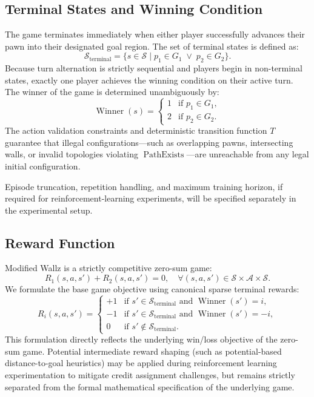 \documentclass{article}
\begin{document}
\subsection{Terminal States and Winning Condition}
\label{subsec:terminal_states}

The game terminates immediately when either player successfully advances their pawn into their designated goal region. The set of terminal states is defined as:
\begin{equation}
\mathcal{S}_{\text{terminal}} = \big\{ s \in \mathcal{S} \;\big|\; p_1 \in G_1 \;\lor\; p_2 \in G_2 \big\}.
\end{equation}
Because turn alternation is strictly sequential and players begin in non-terminal states, exactly one player achieves the winning condition on their active turn. The winner of the game is determined unambiguously by:
\begin{equation}
\operatorname{Winner}(s) = \begin{cases}
1 & \text{if } p_1 \in G_1, \\
2 & \text{if } p_2 \in G_2.
\end{cases}
\end{equation}
The action validation constraints and deterministic transition function $T$ guarantee that illegal configurations---such as overlapping pawns, intersecting walls, or invalid topologies violating $\operatorname{PathExists}$---are unreachable from any legal initial configuration.

Episode truncation, repetition handling, and maximum training horizon, if required for reinforcement-learning experiments, will be specified separately in the experimental setup.

\subsection{Reward Function}
\label{subsec:reward_function}

Modified Wallz is a strictly competitive zero-sum game:
\begin{equation}
R_1(s, a, s') + R_2(s, a, s') = 0, \quad \forall (s, a, s') \in \mathcal{S} \times \mathcal{A} \times \mathcal{S}.
\end{equation}
We formulate the base game objective using canonical sparse terminal rewards:
\begin{equation}
R_i(s, a, s') = \begin{cases}
+1 & \text{if } s' \in \mathcal{S}_{\text{terminal}} \text{ and } \operatorname{Winner}(s') = i, \\
-1 & \text{if } s' \in \mathcal{S}_{\text{terminal}} \text{ and } \operatorname{Winner}(s') = -i, \\
0 & \text{if } s' \notin \mathcal{S}_{\text{terminal}}.
\end{cases}
\end{equation}
This formulation directly reflects the underlying win/loss objective of the zero-sum game. Potential intermediate reward shaping (such as potential-based distance-to-goal heuristics) may be applied during reinforcement learning experimentation to mitigate credit assignment challenges, but remains strictly separated from the formal mathematical specification of the underlying game.
\end{document}
